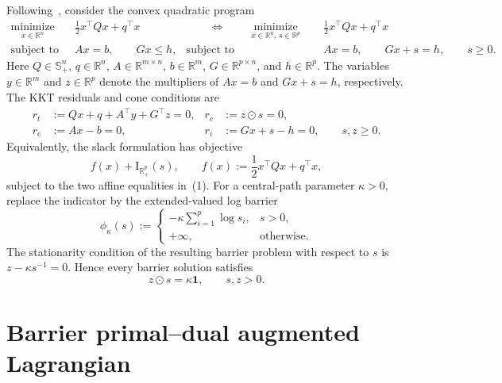 \documentclass[10pt]{article}
\newcommand{\R}{\mathbb{R}}
\newcommand{\one}{\mathbf{1}}
\newcommand{\ind}{\mathrm{I}}
\begin{document}
Following~\cite{arrizabalaga2026single,arrizabalaga2026implicit}, consider the convex quadratic program
\begin{equation}
\begin{aligned}
\underset{x\in\R^n}{\operatorname{minimize}}\quad
    &\frac12x^\top Qx+q^\top x
&\qquad\Longleftrightarrow\qquad
\underset{x\in\R^n,\,s\in\R^p}{\operatorname{minimize}}\quad
    &\frac12x^\top Qx+q^\top x\\
\text{subject to}\quad
    &Ax=b,\qquad Gx\leq h,
&
\text{subject to}\quad
    &Ax=b,\qquad Gx+s=h,\qquad s\geq0.
\end{aligned}
\end{equation}
Here $Q\in\mathbb{S}_+^n$, $q\in\R^n$, $A\in\R^{m\times n}$, $b\in\R^m$, $G\in\R^{p\times n}$, and $h\in\R^p$. The variables $y\in\R^m$ and $z\in\R^p$ denote the multipliers of $Ax=b$ and $Gx+s=h$, respectively. The KKT residuals and cone conditions are
\begin{equation}
\begin{aligned}
r_t&:=Qx+q+A^\top y+G^\top z=0,
&r_c&:=z\odot s=0,\\
r_e&:=Ax-b=0,
&r_i&:=Gx+s-h=0,
\qquad s,z\geq0.
\end{aligned}
\end{equation}
Equivalently, the slack formulation has objective
\begin{equation}
f(x)+\ind_{\R_+^p}(s),
\qquad
f(x):=\frac12x^\top Qx+q^\top x,
\end{equation}
subject to the two affine equalities in~(1). For a central-path parameter $\kappa>0$, replace the indicator by the extended-valued log barrier
\begin{equation}
\phi_\kappa(s):=
\begin{cases}
-\kappa\displaystyle\sum_{i=1}^p\log s_i,&s>0,\\
+\infty,&\text{otherwise}.
\end{cases}
\end{equation}
The stationarity condition of the resulting barrier problem with respect to $s$ is $z-\kappa s^{-1}=0$. Hence every barrier solution satisfies
\begin{equation}
z\odot s=\kappa\one,
\qquad s,z>0.
\end{equation}

\section{Barrier primal--dual augmented Lagrangian}
\end{document}

